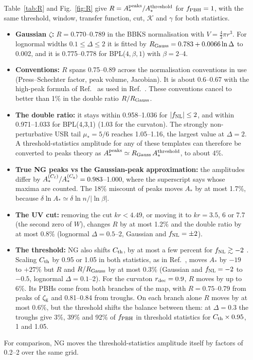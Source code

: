 \documentclass[11pt,a4paper]{article}
\newcommand{\Cg}{C_{\rm g}}
\newcommand{\Cl}{C_{\ell}}
\newcommand{\zg}{\zeta_{\rm g}}
\newcommand{\fnl}{f_{\rm NL}}
\newcommand{\fpbh}{f_{\rm PBH}}
\begin{document}
Table~\ref{tab:R} and Fig.~\ref{fig:R} give $R=A_*^{\rm peaks}/A_*^{\rm threshold}$ for
$\fpbh=1$, with the same threshold, window, transfer function, cut, $\mathcal K$ and $\gamma$ for
both statistics.
\begin{itemize}
\item \textbf{Gaussian $\zeta$:} $R=0.770$--$0.789$ in the BBKS normalisation with
$V=\frac43\pi r^3$. For lognormal widths $0.1\le\Delta\le2$ it is fitted by
$R_{\rm Gauss}=0.783+0.0066\ln\Delta$ to 0.002, and it is 0.775--0.778 for BPL($4,\beta,1$) with
$\beta=2$--4.
\item \textbf{Conventions:} $R$ spans 0.75--0.89 across the normalisation conventions in use
(Press--Schechter factor, peak volume, Jacobian). It is about 0.6--0.67 with the high-peak
formula of Ref.~\cite{Iovino24} as used in Ref.~\cite{Blas26}. These conventions cancel to
better than 1\% in the double ratio $R/R_{\rm Gauss}$.
\item \textbf{The double ratio:} it stays within 0.958--1.036 for $|\fnl|\le2$, and within
0.971--1.033 for BPL(4,3,1) (1.03 for the curvaton). The strongly non-perturbative USR tail
$\mu_*=5/6$ reaches 1.05--1.16, the largest value at $\Delta=2$. A threshold-statistics amplitude
for any of these templates can therefore be converted to peaks theory as
$A_*^{\rm peaks}\simeq R_{\rm Gauss}\,A_*^{\rm threshold}$, to about 4\%.
\item \textbf{True NG peaks vs the Gaussian-peak approximation:} the amplitudes differ by
$A_*^{(\Cl)}/A_*^{(\Cg)}=0.983$--1.000, where the superscript says whose maxima are counted. The
18\% miscount of peaks moves $A_*$ by at most
1.7\%, because $\delta\ln A_*\simeq\delta\ln n/|\ln\beta|$.
\item \textbf{The UV cut:} removing the cut $kr<4.49$, or moving it to $kr=3.5$, 6 or 7.7 (the
second zero of $W$), changes $R$ by at most 1.2\% and the double ratio by at most 0.8\%
(lognormal $\Delta=0.5$--2, Gaussian and $\fnl=\pm2$).
\item \textbf{The threshold:} NG also shifts $C_{\rm th}$, by at most a few percent for
$\fnl\gtrsim-2$ \cite{KMR19,ETYY22,Iovino24}. Scaling $C_{\rm th}$ by 0.95 or 1.05 in both statistics,
as in Ref.~\cite{Iovino24}, moves $A_*$ by $-19$ to $+27\%$ but $R$ and $R/R_{\rm Gauss}$ by at most
0.3\% (Gaussian and $\fnl=-2$ to $-0.5$, lognormal $\Delta=0.1$--2). For the curvaton
$r_{\rm dec}=0.9$, $R$ moves by up to 6\%. Its PBHs come from both branches of the map, with
$R=0.75$--0.79 from peaks of $\zg$ and 0.81--0.84 from troughs. On each branch alone $R$ moves by
at most 0.6\%, but the threshold shifts the balance between them: at $\Delta=0.3$ the troughs give
3\%, 39\% and 92\% of $\fpbh$ in threshold statistics for $C_{\rm th}\times0.95$, 1 and 1.05.
\end{itemize}
For comparison, NG moves the threshold-statistics amplitude itself by factors of 0.2--2 over the
same grid.
\end{document}

